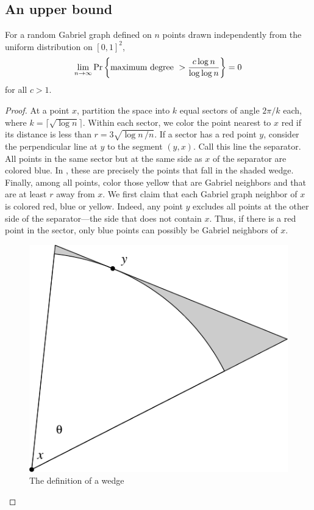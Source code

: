 \documentclass[10pt]{llncs}
\newcommand{\PROB}{\Pr}
\begin{document}
\subsection{An upper bound}

\begin{thm}
For a random Gabriel graph defined on $n$ points drawn
independently from the uniform distribution on
$[0,1]^2$, 
\[
\lim_{n\to\infty} \PROB \left\{ \hbox{\rm maximum degree}~> {c \log n \over
\log \log n} \right\} = 0
\]
for all $c > 1$.
\end{thm}

\begin{proof}
At a point $x$, partition the space into $k$ equal
sectors of angle $2\pi/k$ each, where $k = \lceil \sqrt{\log n} \rceil$.
Within each sector, we color the point nearest to $x$ 
red if its distance is less than $r = 3 \sqrt{\log n\, /n}$.
If a sector has a red point $y$, consider the perpendicular
line at $y$ to the segment $(y,x)$. Call this
line the separator. All points
in the same sector but at the same side as $x$ of the separator
are colored blue. In , these are precisely the points that
fall in the shaded wedge.
Finally, among all points, color those yellow that are
Gabriel neighbors and that are at least $r$ away from $x$.
We first claim that each Gabriel graph neighbor of $x$
is colored red, blue or yellow.
Indeed, any point $y$ excludes all points at the
other side of the separator---the side that does not contain $x$.
Thus, if there is a red point in the sector, only blue points
can possibly be Gabriel neighbors of $x$.


\begin{figure}
\begin{center}\includegraphics[scale=0.7]{wedgedef-inkscape}\end{center}
\caption{The definition of a wedge}
\end{figure}


\end{proof}
\end{document}
